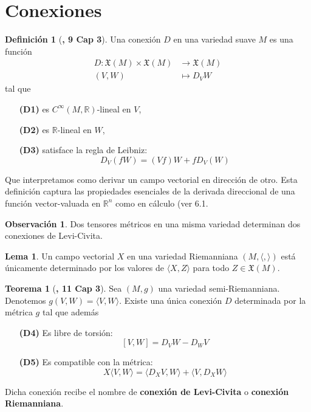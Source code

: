 \documentclass[spanish]{book}
\theoremstyle{definition}
\newtheorem*{defn}{Definición}
\newtheorem*{teo}{Teorema}
\newtheorem*{lema}{Lema}
\newtheorem*{obs}{Observación}
\newcommand{\R}{\mathbb{R}}
\newcommand{\X}{\mathfrak{X}}
\newcommand{\Cinf}{C^\infty}
\begin{document}
	\section{Conexiones}
	\begin{defn}[\cite{ONeill}\textbf{, 9 Cap 3}]
		Una conexión $D$ en una variedad suave $M$ es una función
	\begin{align*}
		D:\X(M)\times\X(M)&\to\X(M)\\
		(V,W)&\mapsto D_VW
	\end{align*}
	tal que
	\begin{enumerate}
		\item[\textbf{(D1)}] es $\Cinf(M,\R)$-lineal en $V$,
		\item[\textbf{(D2)}] es $\R$-lineal en $W$,
		\item[\textbf{(D3)}] satisface la regla de Leibniz:
		\[D_V(fW)=(Vf)W+fD_V(W)\]
	\end{enumerate}
	\end{defn}
	Que interpretamos como derivar un campo vectorial en dirección de otro. Esta definición captura las propiedades esenciales de la derivada direccional de una función vector-valuada en $\R^n$ como en cálculo (ver \cite{Loring-dif} 6.1.
	\begin{obs}
		Dos tensores métricos en una misma variedad determinan dos conexiones de Levi-Civita.
	\end{obs}
	\begin{lema}
		Un campo vectorial $X$ en una variedad Riemanniana $(M,\langle ,\rangle)$ está únicamente determinado por los valores de $\langle X,Z\rangle$ para todo $Z\in\X(M)$.
	\end{lema}
	\begin{teo}[\cite{ONeill}\textbf{, 11 Cap 3}]
		Sea $(M,g)$ una variedad semi-Riemanniana. Denotemos $g(V,W)=\langle V,W\rangle$. Existe una única conexión $D$ determinada por la métrica $g$ tal que además
		\begin{enumerate}
			\item[\textbf{(D4)}] Es libre de torsión:
			\[[V,W]=D_VW-D_WV\]
			\item[\textbf{(D5)}] Es compatible con la métrica:
			\[X\langle V,W\rangle=\langle D_XV,W\rangle+\langle V,D_XW\rangle\]
		\end{enumerate}
		Dicha conexión recibe el nombre de \textbf{conexión de Levi-Civita} o \textbf{conexión Riemanniana}.
	\end{teo}
\end{document}
